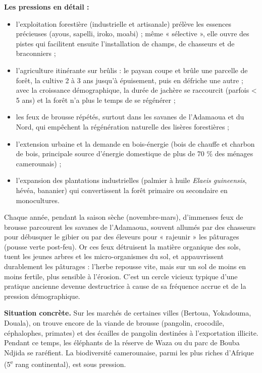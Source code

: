 \documentclass[11pt]{article}
\newcommand{\cle}[1]{{\popxbold\color{popdark}#1}}
\newcounter{popsec}
\newcounter{popsub}
\newcommand{\courssub}[1]{%
  \stepcounter{popsub}%
  \par\vspace{9pt}\noindent{\popxbold\fontsize{11.5}{13}\selectfont\color{popink}{\color{poporange}\thepopsec.\thepopsub}\hspace{6pt}#1}\par\nopagebreak\vspace{4pt}
}
\begin{document}
\textbf{Les pressions en détail :}
\begin{itemize}
  \item l'\cle{exploitation forestière} (industrielle et artisanale) prélève les essences précieuses (ayous, sapelli, iroko, moabi) ; même « sélective », elle ouvre des pistes qui facilitent ensuite l'installation de champs, de chasseurs et de braconniers ;
  \item l'\cle{agriculture itinérante sur brûlis} : le paysan coupe et brûle une parcelle de forêt, la cultive 2 à 3 ans jusqu'à épuisement, puis en défriche une autre ; avec la croissance démographique, la durée de jachère se raccourcit (parfois < 5 ans) et la forêt n'a plus le temps de se régénérer ;
  \item les \cle{feux de brousse} répétés, surtout dans les savanes de l'Adamaoua et du Nord, qui empêchent la régénération naturelle des lisères forestières ;
  \item l'\cle{extension urbaine} et la demande en bois-énergie (bois de chauffe et charbon de bois, principale source d'énergie domestique de plus de 70 \% des ménages camerounais) ;
  \item l'expansion des \cle{plantations industrielles} (palmier à huile \emph{Elaeis guineensis}, hévéa, bananier) qui convertissent la forêt primaire ou secondaire en monocultures.
\end{itemize}

\begin{savaistu}
Chaque année, pendant la saison sèche (novembre-mars), d'immenses feux de brousse parcourent les savanes de l'Adamaoua, souvent allumés par des chasseurs pour débusquer le gibier ou par des éleveurs pour « rajeunir » les pâturages (pousse verte post-feu). Or ces feux détruisent la \cle{matière organique} des sols, tuent les jeunes arbres et les micro-organismes du sol, et appauvrissent durablement les pâturages : l'herbe repousse vite, mais sur un sol de moins en moins fertile, plus sensible à l'érosion. C'est un cercle vicieux typique d'une pratique ancienne devenue destructrice à cause de sa fréquence accrue et de la pression démographique.
\end{savaistu}

\courssub{Les pressions sur la biodiversité}

\textbf{Situation concrète.} Sur les marchés de certaines villes (Bertoua, Yokadouma, Douala), on trouve encore de la viande de brousse (pangolin, crocodile, céphalophes, primates) et des écailles de pangolin destinées à l'exportation illicite. Pendant ce temps, les éléphants de la réserve de Waza ou du parc de Bouba Ndjida se raréfient. La biodiversité camerounaise, parmi les plus riches d'Afrique (5\textsuperscript{e} rang continental), est sous pression.
\end{document}
